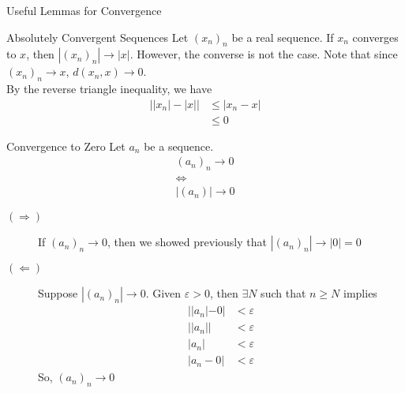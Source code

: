 \documentclass[10pt]{extarticle}
\begin{document}
  \begin{problem}{Useful Lemmas for Convergence}
    \begin{problem}{Absolutely Convergent Sequences}
      Let $(x_n)_n$ be a real sequence. If $x_n$ converges to $x$, then $|(x_n)_n|\rightarrow |x|$. However, the converse is not the case.
      \tcblower
      Note that since $(x_n)_n \rightarrow x$, $d(x_n,x) \rightarrow 0$.\\

      By the reverse triangle inequality, we have
      \begin{align*}
        \left||x_n| - |x|\right| &\leq |x_n - x|\\
        &\leq 0
      \end{align*}
    \end{problem}
    \begin{problem}{Convergence to Zero}
      Let $a_n$ be a sequence.
      \begin{align*}
        (a_n)_n \rightarrow 0\\
        \Leftrightarrow\\
        |(a_n)| \rightarrow 0
      \end{align*}
      \tcblower
      \begin{description}
        \item[$(\Rightarrow)$] If $(a_n)_n \rightarrow 0$, then we showed previously that $|(a_n)_n| \rightarrow |0| = 0$
        \item[$(\Leftarrow)$] Suppose $|(a_n)_n| \rightarrow 0$. Given $\varepsilon > 0$, then $\exists N$ such that $n \geq N$ implies
          \begin{align*}
            ||a_n|-0| &< \varepsilon\\
            ||a_n|| &< \varepsilon\\
            |a_n| &< \varepsilon\\
            |a_n - 0| &< \varepsilon
          \end{align*}
          So, $\left(a_n\right)_n \rightarrow 0$
      \end{description}
    \end{problem}
  \end{problem}
\end{document}
